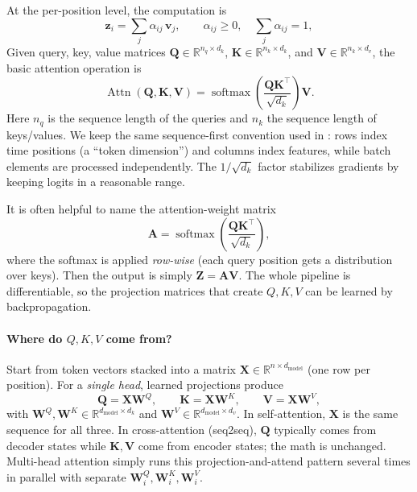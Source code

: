At the per-position level, the computation is
\[
\mathbf{z}_i = \sum_{j} \alpha_{ij}\,\mathbf{v}_j,\qquad
\alpha_{ij} \ge 0,\quad \sum_j \alpha_{ij} = 1,
\]
Given query, key, value matrices \(\mathbf{Q} \in \mathbb{R}^{n_q \times d_k}\), \(\mathbf{K} \in \mathbb{R}^{n_k \times d_k}\), and \(\mathbf{V} \in \mathbb{R}^{n_k \times d_v}\), the basic attention operation is
\begin{equation}
    \operatorname{Attn}(\mathbf{Q}, \mathbf{K}, \mathbf{V})
    = \operatorname{softmax}\!\left(\frac{\mathbf{Q}\mathbf{K}^\top}{\sqrt{d_k}}\right) \mathbf{V}.
    \label{eq:transformers_scaled_dot_product_attention}
\end{equation}
Here \(n_q\) is the sequence length of the queries and \(n_k\) the sequence length of keys/values. We keep the same sequence-first convention used in : rows index time positions (a ``token dimension'') and columns index features, while batch elements are processed independently. The \(1/\sqrt{d_k}\) factor stabilizes gradients by keeping logits in a reasonable range.

It is often helpful to name the attention-weight matrix
\[
\mathbf{A}=\operatorname{softmax}\!\left(\frac{\mathbf{Q}\mathbf{K}^\top}{\sqrt{d_k}}\right),
\]
where the softmax is applied \emph{row-wise} (each query position gets a distribution over keys).
Then the output is simply \(\mathbf{Z}=\mathbf{A}\mathbf{V}\). The whole pipeline is differentiable, so the
projection matrices that create \(Q,K,V\) can be learned by backpropagation.

\paragraph{Where do \(Q,K,V\) come from?}
Start from token vectors stacked into a matrix \(\mathbf{X}\in\mathbb{R}^{n\times d_{\text{model}}}\) (one row per position). For a \emph{single head}, learned projections produce
\begin{equation}
    \mathbf{Q}=\mathbf{X}\mathbf{W}^Q,\qquad
    \mathbf{K}=\mathbf{X}\mathbf{W}^K,\qquad
    \mathbf{V}=\mathbf{X}\mathbf{W}^V,
    \label{eq:transformers_qkv_projections}
\end{equation}
with \(\mathbf{W}^Q,\mathbf{W}^K\in\mathbb{R}^{d_{\text{model}}\times d_k}\) and \(\mathbf{W}^V\in\mathbb{R}^{d_{\text{model}}\times d_v}\).
In self-attention, \(\mathbf{X}\) is the same sequence for all three. In cross-attention (seq2seq), \(\mathbf{Q}\) typically comes from decoder states while \(\mathbf{K},\mathbf{V}\) come from encoder states; the math is unchanged. Multi-head attention simply runs this projection-and-attend pattern several times in parallel with separate \(\mathbf{W}_i^Q,\mathbf{W}_i^K,\mathbf{W}_i^V\).

